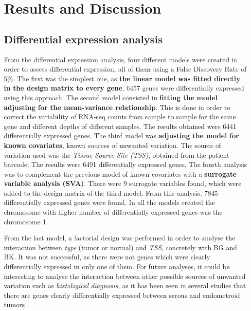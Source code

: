 \documentclass[9pt,twocolumn,twoside]{gsajnl}
\begin{document}


\section*{Results and Discussion}

\subsection{Differential expression analysis}

From the differential expression analysis, four different models were created in order to assess differential expression, all of them using a False Discovery Rate of 5\%. The first was the simplest one, as \textbf{the linear model was fitted directly in the design matrix to every gene}. 6457 genes were differentially expressed using this approach. The second model consisted in \textbf{fitting the model adjusting for the mean-variance relationship}. This is done in order to correct the variability of RNA-seq counts from sample to sample for the same gene and different depths of different samples. The results obtained were 6441 differentially expressed genes. The third model was \textbf{adjusting the model for known covariates}, known sources of unwanted variation. The source of variation used was the \textit{Tissue Source Site (TSS)}, obtained from the patient barcode. The results were 6491 differentially expressed genes. The fourth analysis was to complement the previous model of known covariates with a \textbf{surrogate variable analysis (SVA)}. There were 9 surrogate variables found, which were added to the design matrix of the third model. From this analysis, 7845 differentially expressed genes were found. In all the models created the chromosome with higher number of differentially expressed genes was the chromosome 1.

From the last model, a factorial design was performed in order to analyse the interaction between \textit{type} (tumor or normal) and \textit{TSS}, concretely with BG and BK. It was not successful, as there were not genes which were clearly differentially expressed in only one 	of them. For future analyses, it could be interesting to analyse the interaction between other possible sources of unwanted variation such as \textit{histological diagnosis}, as it has been seen in several studies that there are genes clearly differentially expressed between serous and endometroid tumors \citep{Getz2013}.
\end{document}
